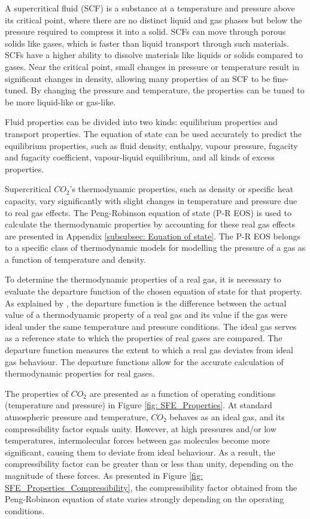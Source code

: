 \documentclass[../Article_Model_Parameters.tex]{subfiles}
\begin{document}
	
	A supercritical fluid (SCF) is a substance at a temperature and pressure above its critical point, where there are no distinct liquid and gas phases but below the pressure required to compress it into a solid. SCFs can move through porous solids like gases, which is faster than liquid transport through such materials. SCFs have a higher ability to dissolve materials like liquids or solids compared to gases. Near the critical point, small changes in pressure or temperature result in significant changes in density, allowing many properties of an SCF to be fine-tuned. By changing the pressure and temperature, the properties can be tuned to be more liquid-like or gas-like.

	Fluid properties can be divided into two kinds: equilibrium properties and transport properties. The equation of state can be used accurately to predict the equilibrium properties, such as fluid density, enthalpy, vapour pressure, fugacity and fugacity coefficient, vapour-liquid equilibrium, and all kinds of excess properties.
	
	Supercritical $CO_2$'s thermodynamic properties, such as density or specific heat capacity, vary significantly with slight changes in temperature and pressure due to real gas effects. The Peng-Robinson equation of state (P-R EOS) is used to calculate the thermodynamic properties by accounting for these real gas effects are presented in Appendix \ref{subsubsec: Equation of state}. The P-R EOS belongs to a specific class of thermodynamic models for modelling the pressure of a gas as a function of temperature and density.
	
	To determine the thermodynamic properties of a real gas, it is necessary to evaluate the departure function of the chosen equation of state for that property. As explained by \citet{Elliott2011}, the departure function is the difference between the actual value of a thermodynamic property of a real gas and its value if the gas were ideal under the same temperature and pressure conditions. The ideal gas serves as a reference state to which the properties of real gases are compared. The departure function measures the extent to which a real gas deviates from ideal gas behaviour. The departure functions allow for the accurate calculation of thermodynamic properties for real gases. %
	
	The properties of $CO_2$  are presented as a function of operating conditions (temperature and pressure) in Figure \ref{fig: SFE_Properties}. At standard atmospheric pressure and temperature, $CO_2$  behaves as an ideal gas, and its compressibility factor equals unity. However, at high pressures and/or low temperatures, intermolecular forces between gas molecules become more significant, causing them to deviate from ideal behaviour. As a result, the compressibility factor can be greater than or less than unity, depending on the magnitude of these forces. As presented in Figure \ref{fig: SFE_Properties_Compressibility}, the compressibility factor obtained from the Peng-Robinson equation of state varies strongly depending on the operating conditions. 
	
\end{document}
